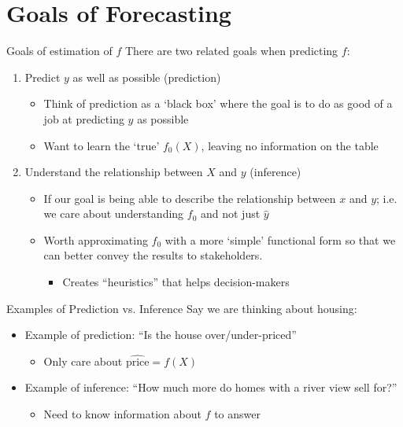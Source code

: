 \documentclass[aspectratio=169,t,11pt,table]{beamer}
\begin{document}
\section{Goals of Forecasting}

\begin{frame}{Goals of estimation of $f$}
  There are two related goals when predicting $f$:
  \begin{enumerate}
    \item Predict $y$ as well as possible (\alert{prediction})
    \begin{itemize}
      \item Think of prediction as a `black box' where the goal is to do as good of a job at predicting $y$ as possible
      
      \item Want to learn the `true' $f_0(X)$, leaving no information on the table
    \end{itemize}
    
    \bigskip
    \item Understand the relationship between $X$ and $y$ (\alert{inference})
    \begin{itemize}
      \item If our goal is being able to describe the relationship between $x$ and $y$; i.e. we care about understanding $f_0$ and not just $\hat{y}$
      
      \item Worth approximating $f_0$ with a more `simple' functional form so that we can better convey the results to stakeholders. 
      \begin{itemize}
        \item Creates ``heuristics'' that helps decision-makers
      \end{itemize}
    \end{itemize}
  \end{enumerate}
\end{frame}

\begin{frame}{Examples of Prediction vs. Inference}
  Say we are thinking about housing:
  \begin{itemize}
    \item Example of prediction: ``Is the house over/under-priced''
    \begin{itemize}
      \item Only care about $\hat{\text{price}} = f(X)$
    \end{itemize}

    \bigskip
    \item Example of inference: ``How much more do homes with a river view sell for?''
    \begin{itemize}
      \item Need to know information about $f$ to answer
    \end{itemize}
  \end{itemize}
\end{frame}
\end{document}
